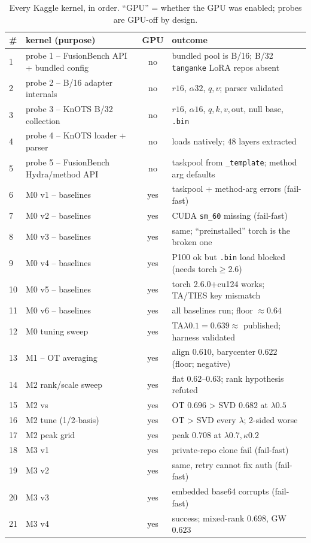 \begin{table}[h]
\centering
\caption{Every Kaggle kernel, in order. ``GPU'' = whether the GPU was enabled; probes are GPU-off by
design.}
\label{tab:timeline}
\small
\begin{tabular}{p{0.4cm} p{5.4cm} c p{6.6cm}}
\toprule
\# & kernel (purpose) & GPU & outcome \\
\midrule
1 & probe 1 -- FusionBench API + bundled config & no & bundled pool is B/16; B/32 \texttt{tanganke} LoRA
repos absent \\
2 & probe 2 -- B/16 adapter internals & no & $r16$, $\alpha32$, $q,v$; parser validated \\
3 & probe 3 -- KnOTS B/32 collection & no & $r16$, $\alpha16$, $q,k,v,\text{out}$, null base, \texttt{.bin} \\
4 & probe 4 -- KnOTS loader + parser & no & loads natively; $48$ layers extracted \\
5 & probe 5 -- FusionBench Hydra/method API & no & taskpool from \texttt{\_template}; method arg defaults \\
6 & M0 v1 -- baselines & yes & taskpool + method-arg errors (fail-fast) \\
7 & M0 v2 -- baselines & yes & CUDA \texttt{sm\_60} missing (fail-fast) \\
8 & M0 v3 -- baselines & yes & same; ``preinstalled'' torch is the broken one \\
9 & M0 v4 -- baselines & yes & P100 ok but \texttt{.bin} load blocked (needs torch$\ge$2.6) \\
10 & M0 v5 -- baselines & yes & torch 2.6.0+cu124 works; TA/TIES key mismatch \\
11 & M0 v6 -- baselines & yes & all baselines run; floor $\approx0.64$ \\
12 & M0 tuning sweep & yes & TA$\lambda0.1{=}0.639\approx$ published; harness validated \\
13 & M1 -- OT averaging & yes & align $0.610$, barycenter $0.622$ (floor; negative) \\
14 & M2 rank/scale sweep & yes & flat $0.62$--$0.63$; rank hypothesis refuted \\
15 & M2 \otties{} vs \svdties{} & yes & OT $0.696$ > SVD $0.682$ at $\lambda0.5$ \\
16 & M2 tune (1/2-basis) & yes & OT > SVD every $\lambda$; 2-sided worse \\
17 & M2 \otties{} peak grid & yes & peak $0.708$ at $\lambda0.7,\kappa0.2$ \\
18 & M3 v1 & yes & private-repo clone fail (fail-fast) \\
19 & M3 v2 & yes & same, retry cannot fix auth (fail-fast) \\
20 & M3 v3 & yes & embedded base64 corrupts (fail-fast) \\
21 & M3 v4 & yes & success; mixed-rank \otties{} $0.698$, GW $0.623$ \\
\bottomrule
\end{tabular}
\end{table}

